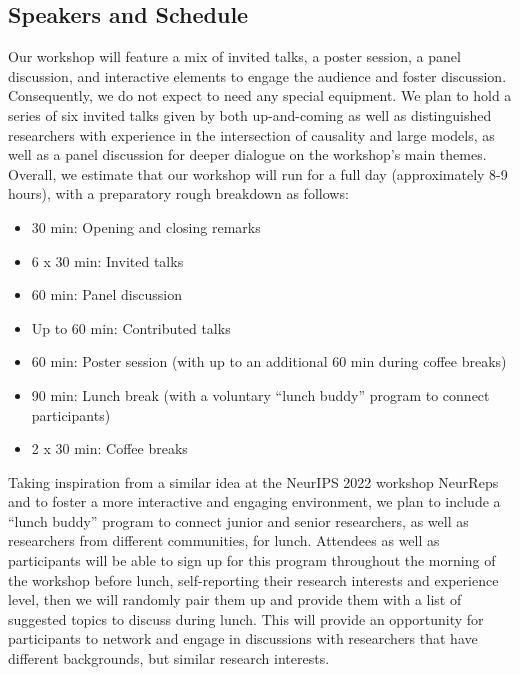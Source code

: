 \documentclass{article}
\begin{document}


\subsection{Speakers and Schedule}

Our workshop will feature a mix of invited talks, a poster session, a panel discussion, and interactive elements to engage the audience and foster discussion. Consequently, we do not expect to need any special equipment.
We plan to hold a series of six invited talks given by both up-and-coming as well as distinguished researchers with experience in the intersection of causality and large models, as well as a panel discussion for deeper dialogue on the workshop's main themes. Overall, we estimate that our workshop will run for a full day (approximately 8-9 hours), with a preparatory rough breakdown as follows:


\begin{itemize}[nolistsep]
    \item 30 min: Opening and closing remarks
    \item 6 x 30 min: Invited talks
    \item 60 min: Panel discussion
    \item Up to 60 min: Contributed talks
    \item 60 min: Poster session (with up to an additional 60 min during coffee breaks)
    \item 90 min: Lunch break (with a voluntary ``lunch buddy'' program to connect participants)
    \item 2 x 30 min: Coffee breaks
\end{itemize}





Taking inspiration from a similar idea at the NeurIPS 2022 workshop NeurReps and to foster a more interactive and engaging environment, we plan to include a ``lunch buddy'' program to connect junior and senior researchers, as well as researchers from different communities, for lunch. 
Attendees as well as participants will be able to sign up for this program throughout the morning of the workshop before lunch, self-reporting their research interests and experience level, then we will randomly pair them up and provide them with a list of suggested topics to discuss during lunch.
This will provide an opportunity for participants to network and engage in discussions with researchers that have different backgrounds, but similar research interests.
\end{document}
